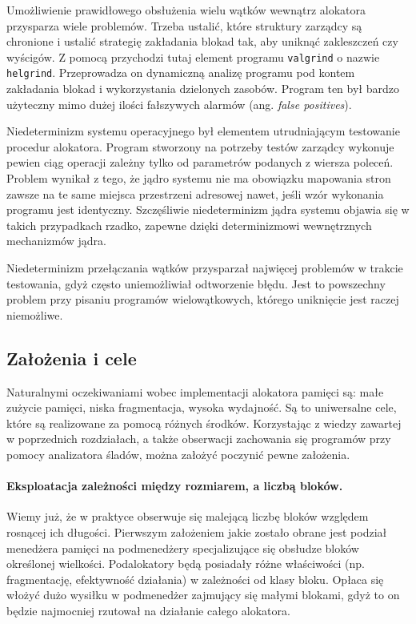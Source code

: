 \documentclass[12pt,a4paper,titlepage,twoside]{mwart}
\begin{document}
Umożliwienie prawidłowego obsłużenia wielu wątków wewnątrz alokatora przysparza
wiele problemów. Trzeba ustalić, które struktury zarządcy są chronione i
ustalić strategię zakładania blokad tak, aby uniknąć zakleszczeń czy wyścigów.
Z pomocą przychodzi tutaj element programu \verb+valgrind+ o nazwie
\verb+helgrind+. Przeprowadza on dynamiczną analizę programu pod kontem
zakładania blokad i wykorzystania dzielonych zasobów. Program ten był bardzo
użyteczny mimo dużej ilości fałszywych alarmów (ang. \textit{false positives}).

Niedeterminizm systemu operacyjnego był elementem utrudniającym testowanie
procedur alokatora. Program stworzony na potrzeby testów zarządcy wykonuje
pewien ciąg operacji zależny tylko od parametrów podanych z wiersza poleceń.
Problem wynikał z tego, że jądro systemu nie ma obowiązku mapowania stron
zawsze na te same miejsca przestrzeni adresowej nawet, jeśli wzór wykonania
programu jest identyczny.  Szczęśliwie niedeterminizm jądra systemu objawia się
w takich przypadkach rzadko, zapewne dzięki determinizmowi wewnętrznych
mechanizmów jądra.
	
Niedeterminizm przełączania wątków przysparzał najwięcej problemów w trakcie
testowania, gdyż często uniemożliwiał odtworzenie błędu. Jest to powszechny
problem przy pisaniu programów wielowątkowych, którego uniknięcie jest raczej
niemożliwe.

\subsection{Założenia i cele}

Naturalnymi oczekiwaniami wobec implementacji alokatora pamięci są: małe
zużycie pamięci, niska fragmentacja, wysoka wydajność. Są to uniwersalne cele,
które są realizowane za pomocą różnych środków. Korzystając z wiedzy zawartej w
poprzednich rozdziałach, a także obserwacji zachowania się programów przy
pomocy analizatora śladów, można założyć poczynić pewne założenia.

\paragraph{Eksploatacja zależności między rozmiarem, a liczbą bloków.} Wiemy
już, że w praktyce obserwuje się malejącą liczbę bloków względem rosnącej ich
długości. Pierwszym założeniem jakie zostało obrane jest podział menedżera
pamięci na podmenedżery specjalizujące się obsłudze bloków określonej
wielkości. Podalokatory będą posiadały różne właściwości (np. fragmentację,
efektywność działania) w zależności od klasy bloku. Opłaca się włożyć dużo
wysiłku w podmenedżer zajmujący się małymi blokami, gdyż to on będzie
najmocniej rzutował na działanie całego alokatora.
\end{document}
